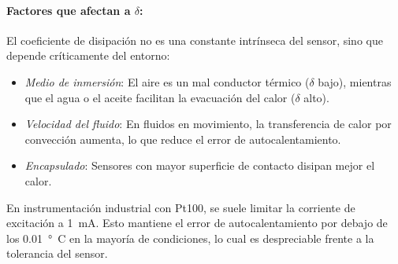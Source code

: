 \begin{marginfigure}[0em]
    \centering
    \shorthandoff{>}
    \caption[Error por autocalentamiento.]{Error por autocalentamiento en una Pt100. El error crece de forma cuadrática con la corriente de excitación.}\label{fig:curva_autocalentamiento}
\end{marginfigure}

\paragraph{Factores que afectan a $\delta$:}
El coeficiente de disipación no es una constante intrínseca del sensor, sino que depende críticamente del entorno:
\begin{itemize}
    \item \emph{Medio de inmersión}: El aire es un mal conductor térmico ($\delta$ bajo), mientras que el agua o el aceite facilitan la evacuación del calor ($\delta$ alto).
    \item \emph{Velocidad del fluido}: En fluidos en movimiento, la transferencia de calor por convección aumenta, lo que reduce el error de autocalentamiento.
    \item \emph{Encapsulado}: Sensores con mayor superficie de contacto disipan mejor el calor.
\end{itemize}

En instrumentación industrial con Pt100, se suele limitar la corriente de excitación a \qty{1}{mA}. Esto mantiene el error de autocalentamiento por debajo de los \qty{0,01}{\degree C} en la mayoría de condiciones, lo cual es despreciable frente a la tolerancia del sensor.


